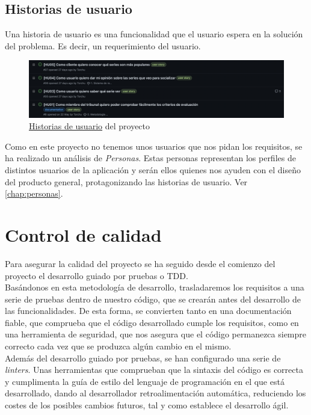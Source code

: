 \subsection{Historias de usuario}
Una historia de usuario es una funcionalidad que el usuario espera en la solución del problema. Es decir, un
requerimiento del usuario.\\

\begin{figure}[H]
	\centering	
	\includegraphics[scale=0.3]{img/user-stories.png}
	\caption{\href{https://github.com/Torchu/flixbuff/issues?q=is%3Aissue+is%3Aopen+label%3A%22user+story%22}{Historias 
    de usuario} del proyecto}\label{fig:user_stories}
\end{figure}

Como en este proyecto no tenemos unos usuarios que nos pidan los requisitos, se ha realizado un análisis de
\textit{Personas}\cite{personas}. Estas personas representan los perfiles de distintos usuarios de la aplicación y
serán ellos quienes nos ayuden con el diseño del producto general, protagonizando las historias de usuario. Ver
\autoref{chap:personas}.\\

\section{Control de calidad}\label{sec:control_de_calidad}
Para asegurar la calidad del proyecto se ha seguido desde el comienzo del proyecto el desarrollo guiado por pruebas o
TDD\cite{TDD}.\\

Basándonos en esta metodología de desarrollo, trasladaremos los requisitos a una serie de pruebas dentro de nuestro
código, que se crearán antes del desarrollo de las funcionalidades. De esta forma, se convierten tanto en una
documentación fiable, que comprueba que el código desarrollado cumple los requisitos, como en una herramienta de
seguridad, que nos asegura que el código permanezca siempre correcto cada vez que se produzca algún cambio en el
mismo.\\

Además del desarrollo guiado por pruebas, se han configurado una serie de \textit{linters}. Unas herramientas que
comprueban que la sintaxis del código es correcta y cumplimenta la guía de estilo del lenguaje de programación en el
que está desarrollado, dando al desarrollador retroalimentación automática, reduciendo los costes de los posibles
cambios futuros, tal y como establece el desarrollo ágil.\\

